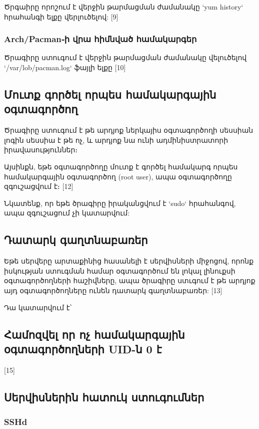 \documentclass[11pt]{article}
\begin{document}
\begin{sloppypar}
Ծրգաիրը որոշում է վերջին թարմացման ժամանակը `yum history`
հրահանգի ելքը վերլուծելով: [9]

\subsubsection{Arch/Pacman֊ի վրա հիմնված համակարգեր}

Ծրագիրը ստուգում է վերջին թարմացման ժամանակը վելուծելով
`/var/lob/pacman.log` ֆայլի ելքը [10]

\subsection{Մուտք գործել որպես համակարգային օգտագործող}

Ծրագիրը ստուգում է թե արդյոք ներկայիս օգտագործողի սեսսիան
լոգին սեսսիա է թե ոչ, և արդյոք նա ունի ադմինիստրատորի
իրավասություններ։

Այսինքն, եթե օգտագործողը մուտք է գործել համակարգ որպես
համակարգային օգտագործող (root user), ապա օգտագործողը
զգուշացվում է։ [12]

Նկատենք, որ եթե ծրագիրը իրականցվում է `sudo` հրահանգով,
ապա զգուշացում չի կատարվում:


\subsection{Դատարկ գաղտնաբառեր}

Եթե սերվերը արտաքինից հասանելի է սերվիսների միջոցով,
որոնք իսկության ստուգման համար օգտագործում են լոկալ
լինուքսի օգտագործողների հաշիվները, ապա ծրագիրը ստւգում է
թե արդյոք այդ օգտագործողները ունեն դատարկ գաղտնաբառեր: [13]

Դա կատարվում է՝



\subsection{Համոզվել որ ոչ համակարգային օգտագործողների UID-ն 0 է}

[15]

\subsection{Սերվիսներին հատուկ ստուգումներ}

\subsubsection{SSHd}


\end{sloppypar}
\end{document}
